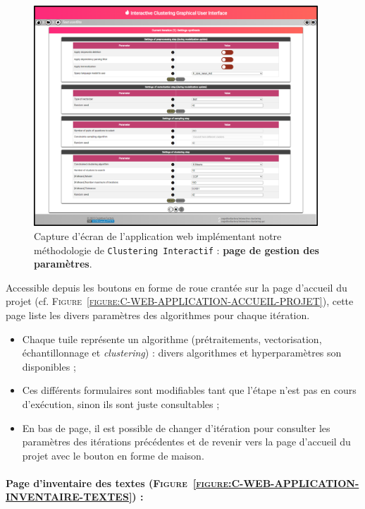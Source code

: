 		\begin{figure}[H]
			\centering
			\includegraphics[width=0.95\textwidth]{figures/interactive-clustering-application-parametres}
			\caption{
				Capture d'écran de l'application web implémentant notre méthodologie de \texttt{Clustering Interactif} : \textbf{page de gestion des paramètres}.
			}
			\label{figure:C-WEB-APPLICATION-PARAMETRAGE}
		\end{figure}
		
		Accessible depuis les boutons en forme de roue crantée sur la page d'accueil du projet (cf. \textsc{Figure~\ref{figure:C-WEB-APPLICATION-ACCUEIL-PROJET}}), cette page liste les divers paramètres des algorithmes pour chaque itération.
		\begin{itemize}
			\item Chaque tuile représente un algorithme (prétraitements, vectorisation, échantillonnage et \textit{clustering}) : divers algorithmes et hyperparamètres son disponibles ;
			\item Ces différents formulaires sont modifiables tant que l'étape n'est pas en cours d'exécution, sinon ils sont juste consultables ;
			\item En bas de page, il est possible de changer d'itération pour consulter les paramètres des itérations précédentes et de revenir vers la page d'accueil du projet avec le bouton en forme de maison.
		\end{itemize}
	
	
	\newpage
	\paragraph{Page d'inventaire des textes (\textsc{Figure~\ref{figure:C-WEB-APPLICATION-INVENTAIRE-TEXTES}}) :}
	
